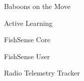 \item Baboons on the Move
\item Active Learning
\item FishSense Core
\item FishSense User
\item Radio Telemetry Tracker
